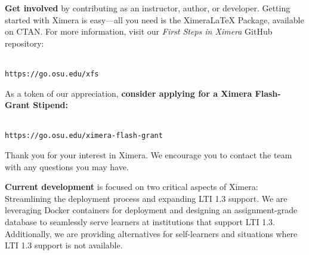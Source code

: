 \documentclass[twocolumn]{article}
\begin{document}
\begin{xframe}
    {\sffamily\bfseries Get involved} by contributing as an instructor, author,
    or developer. Getting started with Ximera is easy---all you need is the
    XimeraLaTeX Package, available on CTAN. For more information, visit our
    \textit{First Steps in Ximera} GitHub repository:
    \begin{center}
        \\
        \small\tt https://go.osu.edu/xfs
    \end{center}
    As a token of our appreciation, \textbf{consider applying for a Ximera
        Flash-Grant Stipend:}
    \begin{center}
        \\
        \small\tt https://go.osu.edu/ximera-flash-grant
    \end{center}
    Thank you for your interest in Ximera. We encourage you to contact the
    team with any questions you may have.
\end{xframe}


\vspace{-.2cm}  


\begin{xframe}
    {\sffamily\bfseries Current development} is focused on two critical aspects
    of Ximera: Streamlining the deployment process and expanding LTI 1.3
    support.
    We are leveraging Docker containers for deployment and designing an
    assignment-grade database to seamlessly serve learners at institutions that
    support LTI 1.3. Additionally, we are providing alternatives for
    self-learners
    and situations where LTI 1.3 support is not available.
    \begin{center}
    \end{center}
\end{xframe}
\end{document}
